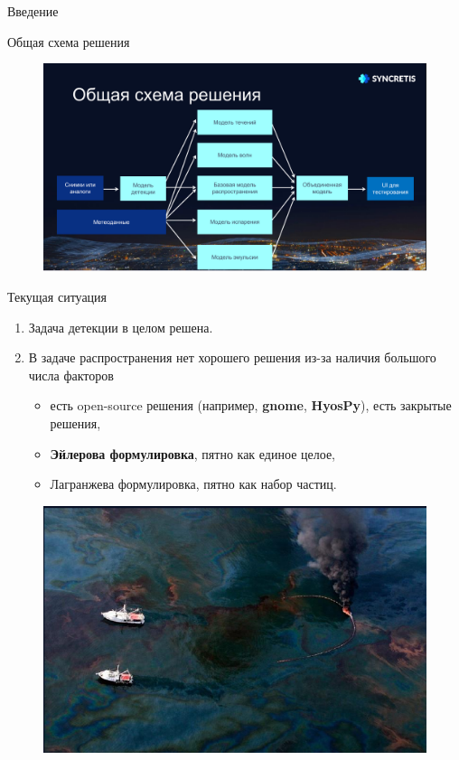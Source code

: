 \documentclass{beamer}
\begin{document}
\begin{section}{Введение}
\begin{frame}{Общая схема решения}

\begin{figure}[H]
	\centering
	\includegraphics[scale=0.15]{general_scheme_for_oil.png}
\end{figure}
	
\end{frame}

\begin{frame}{Текущая ситуация}
		
\begin{enumerate}
	\item Задача детекции в целом решена.
	\item В задаче распространения нет хорошего решения из-за наличия большого числа факторов
	\begin{itemize}
		\item есть open-source решения (например, \textbf{gnome}, \textbf{HyosPy}), есть закрытые решения,
		\item \textbf{Эйлерова формулировка}, пятно как единое целое,
		\item Лагранжева формулировка, пятно как набор частиц.
	\end{itemize}
\end{enumerate}

\begin{figure}[H]
	\centering
	\includegraphics[scale=0.25]{example_oil.png}
\end{figure}
		
\end{frame}

\end{section}
\end{document}
